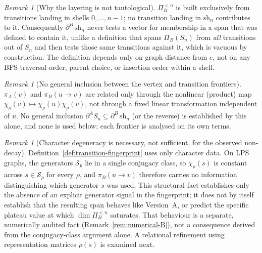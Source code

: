 \documentclass[11pt,a4paper]{article}
\theoremstyle{plain}
\theoremstyle{definition}
\theoremstyle{remark}
\newtheorem{remark}[theorem]{Remark}
\newcommand{\dA}{\partial^A}
\newcommand{\dB}{\partial^B}
\newcommand{\piA}{\pi_A}
\newcommand{\piB}{\pi_B}
\newcommand{\PiBn}[1]{\Pi_B^{<#1}}
\begin{document}
      \begin{remark}[Why the layering is not tautological]
        \label{rem:layering-nontautological}
        $\PiBn{n}$ is built exclusively from transitions landing in shells $0, \ldots, n-1$; no
        transition landing in $\mathrm{sh}_n$ contributes to it.
        Consequently $\dB\, \mathrm{sh}_n$ never tests a vector for membership in a span that was
        defined to contain it, unlike a definition that spans $\Pi_B(S_n)$ from \emph{all}
        transitions out of $S_n$ and then tests those same transitions against it, which is
        vacuous by construction.
        The definition depends only on graph distance from $e$, not on any BFS traversal order,
        parent choice, or insertion order within a shell.
      \end{remark}

      \begin{remark}[No general inclusion between the vertex and transition frontiers]
        \label{rem:frontier-hierarchy}
        $\piA(v)$ and $\piB(u\to v)$ are related only through the nonlinear (product) map
        $\chi_\rho(v) \mapsto \chi_\rho(u)\chi_\rho(v)$, not through a fixed linear transformation
        independent of $u$.
        No general inclusion $\dA S_n \subseteq \dB\, \mathrm{sh}_n$ (or the reverse) is established
        by this alone, and none is used below; each frontier is analysed on its own terms.
      \end{remark}

      \begin{remark}[Character degeneracy is necessary, not sufficient, for the observed non-decay]
        \label{rem:character-B-limitation}
        Definition~\ref{def:transition-fingerprint} uses only character data.
        On LPS graphs, the generators $\mathcal{S}_p$ lie in a single conjugacy class, so
        $\chi_\rho(s)$ is constant across $s \in \mathcal{S}_p$ for every $\rho$, and $\piB(u\to v)$
        therefore carries no information distinguishing which generator $s$ was used.
        This structural fact establishes only the absence of an explicit generator signal in the
        fingerprint; it does not by itself establish that the resulting span behaves like Version~A,
        or predict the specific plateau value at which $\dim\PiBn{n}$ saturates.
        That behaviour is a separate, numerically audited fact (Remark~\ref{rem:numerical-B}), not a
        consequence derived from the conjugacy-class argument alone.
        A relational refinement using representation matrices $\rho(s)$ is examined next.
      \end{remark}
\end{document}

